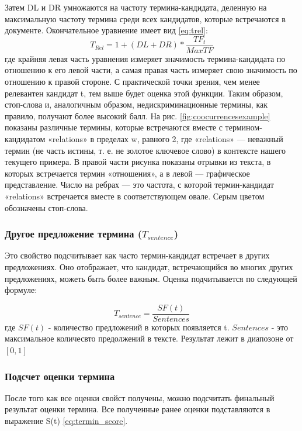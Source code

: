 Затем DL и DR умножаются на частоту термина-кандидата, деленную на максимальную частоту термина среди всех кандидатов, которые встречаются в документе.
Окончательное уравнение имеет вид \eqref{eq:trel}:
\begin{equation}
	\label{eq:trel}
	T_{Rel} = 1 + (DL + DR) * \frac{TF_t}{MaxTF}
\end{equation}
где крайняя левая часть уравнения измеряет значимость термина-кандидата по отношению к его левой части, а
самая правая часть измеряет свою значимость по отношению к правой стороне. С практической точки зрения, чем менее релевантен кандидат t, тем выше будет оценка этой функции.
Таким образом, стоп-слова и, аналогичным образом, недискриминационные термины, как правило, получают более высокий балл. На рис. \eqref{fig:coocurrencesexample} показаны различные термины, которые встречаются вместе с термином-кандидатом «relations» в пределах w, равного 2, где «relations» — неважный термин (не часть истины, т. е. не золотое ключевое слово) в контексте нашего текущего примера.
В правой части рисунка показаны отрывки из текста, в которых встречается термин «отношения», а в левой — графическое представление. 
Число на ребрах — это частота, с которой термин-кандидат «relations» встречается вместе в соответствующем овале. 
Серым цветом обозначены стоп-слова.

\subsubsection{Другое предложение термина ($T_{sentence}$)}

Это свойство подсчитывает как часто термин-кандидат встречает в других предложениях.
Оно отображает, что кандидат, встречающийся во многих других предложениях, можеть быть более важным.
Оценка подчитывается по следующей формуле:

\begin{equation}
	T_{sentence} = \frac{SF(t)}{Sentences}
\end{equation}
где $SF(t)$ - количество предложений в которых появляется t.
$Sentences$ - это максимальное количесвто предолжений в тексте.
Результат лежит в диапозоне от $[0, 1]$


\subsubsection{Подсчет оценки термина}
После того как все оценки свойст получены, можно подсчитать финальный результат оценки термина.
Все полученные ранее оценки подставляются в выражение S(t) \eqref{eq:termin_score}.

